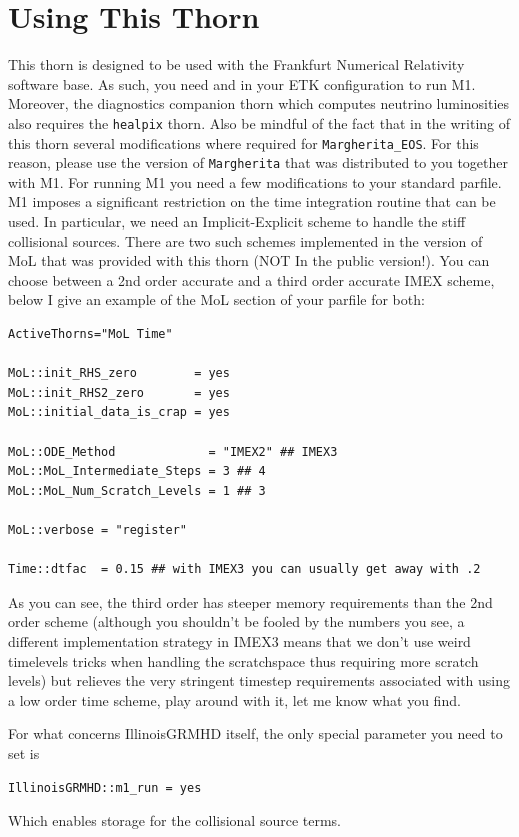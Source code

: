\section{Using This Thorn}

This thorn is designed to be used with the Frankfurt Numerical Relativity software base. As such, you need \FIL and \ANTELOPE in your ETK configuration  to run M1. Moreover, the diagnostics companion thorn which computes neutrino luminosities also requires the \texttt{healpix} thorn. Also be mindful of the fact that in the writing of this thorn several modifications where required for \texttt{Margherita_EOS}. For this  reason, please use the version of \texttt{Margherita} that was distributed to you together with M1.
For running M1 you need a few modifications to your standard parfile.
M1 imposes a significant restriction on the time integration routine that can be used. In particular, we need an Implicit-Explicit scheme to handle the stiff collisional sources. There are two such schemes implemented in the version of MoL that was provided with this thorn (NOT In the public version!).
You can choose between a 2nd order accurate and a third order accurate IMEX scheme, below I give an example of the MoL section of your parfile for both:
\begin{verbatim}
ActiveThorns="MoL Time"

MoL::init_RHS_zero        = yes
MoL::init_RHS2_zero       = yes
MoL::initial_data_is_crap = yes

MoL::ODE_Method             = "IMEX2" ## IMEX3
MoL::MoL_Intermediate_Steps = 3 ## 4
MoL::MoL_Num_Scratch_Levels = 1 ## 3

MoL::verbose = "register"

Time::dtfac  = 0.15 ## with IMEX3 you can usually get away with .2
\end{verbatim}
As you can see, the third order has steeper memory requirements than the 2nd order scheme (although you shouldn't be fooled by the numbers you see, a different implementation strategy in IMEX3 means that we don't use weird timelevels tricks when handling the scratchspace thus requiring more scratch levels) but relieves the very stringent timestep requirements associated with using a low order time scheme, play around with it, let me know what you find.

For what concerns IllinoisGRMHD itself, the only special parameter you need to set is
\begin{verbatim}
IllinoisGRMHD::m1_run = yes
\end{verbatim}
Which enables storage for the collisional source terms.

